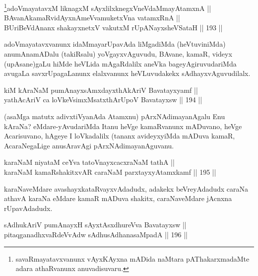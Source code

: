 \begin{shl}
\footnote{savaRmayatavxvanunx vAyxKAyxna mADida naMtara
pAThakarxmadaMte adara athaRvanunx anuvadisuvaru.}adoVmayatavxM liknagxM sAyxlilxknegxVneVdaMmayAtamxnA || \\
BAvanAkamaRvidAyxnAmeVvamuketxVna vatamxRnA || \\
BUriBeVdAnanx shakayxnetxV vakutxM rUpANayxsheVSataH \hfill || 193 ||  
\end{shl}

\begin{artha}
adoVmayatavxvanunx idaMmayarUpavAda liMgadiMda
(heVtuviniMda) anumAnamADalu (takiRsalu) yoVgayxvAguvudu, BAvane,
kamaR, videyx (upAsane)gaLu hiMde heVLida mAgaRdalilx aneVka
bageyAgiruvudariMda avugaLa savxrUpagaLanunx elalxvanunx heVLuvudakekx
sAdhayxvAguvudilalx.
\end{artha}

\begin{shl}
kiM kAraNaM pumAnayxsAmxdayxthAkAriV Bavatayxyamf || \\
yathAcAriV ca loVkeV\s simxMsatxthArUpoV Bavatayxsw \hfill || 194 ||  
\end{shl}

\begin{artha}
(asaMga matutx adivxtiVyanAda Atamxnu) pArxNAdimayanAgalu Enu
kAraNa? eMdare-yAvudariMda Itanu heVge kamaRvanunx mADuvano, heVge
Acarisuvano, hAgeye I loVkadalilx (tananx avideyxyiMda mADuva kamaR,
AcaraNegaLige anusAravAgi pArxNAdimayanAguvanu.
\end{artha}


\begin{shl}
karaNaM niyataM ceYva tatoV\s nayxcacxraNaM tathA || \\
karaNaM kamaRshakitxvAR caraNaM parxtayxyAtamxkamf \hfill || 195 ||  
\end{shl}

\begin{artha}
karaNaveMdare avashayxkataRvayxvAdadudx, adakekx beVreyAdadudx caraNa
athavA karaNa eMdare kamaR mADuva shakitx, caraNaveMdare jAcnxna
rUpavAdadudx.
\end{artha}


\begin{shl}
sAdhukAriV pumAnayxH sAyxtAsxdhureVva Bavatayxsw || \\
pitaqganadhxvaRdeVvAdw sAdhusAdhanasaMpadA \hfill || 196 ||  
\end{shl}

